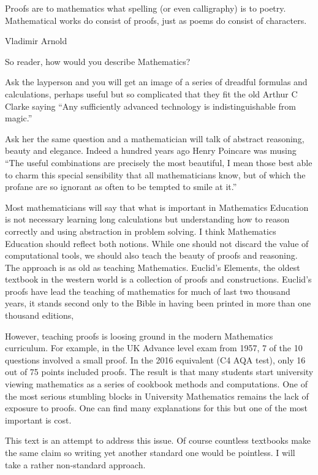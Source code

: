 \preface
\epigraph{Proofs are to mathematics what spelling (or even calligraphy) is to poetry. Mathematical works do consist of proofs, just as poems do consist of characters.}{Vladimir Arnold}




So reader, how would you describe Mathematics?

 Ask  the layperson and you will get an image of a series of dreadful  formulas and calculations,  perhaps useful but  so complicated  that they fit the old Arthur C Clarke saying ``Any sufficiently advanced technology is indistinguishable from magic.''

Ask  her the same question and a mathematician will talk of abstract reasoning,  beauty and elegance. Indeed  a hundred years ago Henry Poincare was musing ``The useful combinations are precisely the most beautiful, I mean those best able to charm this special sensibility that all mathematicians know, but of which the profane are so ignorant as often to be tempted to smile at it.''

Most mathematicians will  say that what is important in Mathematics Education is not necessary learning  long calculations but understanding how to reason correctly and using abstraction in  problem solving. I think Mathematics Education should reflect both notions. While one should not discard the  value of  computational tools, we should also teach the beauty of  proofs and reasoning. The approach is as old as teaching  Mathematics. Euclid's Elements, the oldest textbook in the western world is a collection of proofs and constructions. Euclid's proofs  have lead the teaching of mathematics for much of last two thousand years, it stands second only to the Bible in having been printed in more than one thousand editions, 

However,  teaching  proofs is loosing ground  in the modern Mathematics curriculum. For example,  in the UK   Advance level exam from 1957,  7 of the 10 questions involved a small proof. In the 2016 equivalent (C4 AQA test), only 16 out of 75 points included proofs. The result is that many students start university viewing mathematics  as a series of cookbook methods and computations. One of the most serious stumbling blocks in University Mathematics remains the lack of exposure to proofs. One can find many explanations for this but one of the most important is cost. 

This text is an attempt to address this issue. Of course countless textbooks make the same claim  so writing yet another standard one would be  pointless. I will take a rather  non-standard approach.

